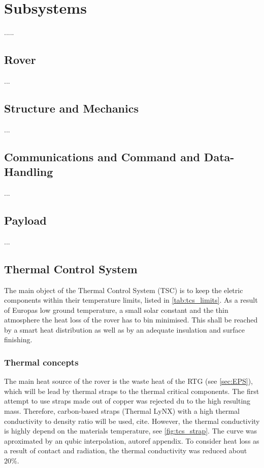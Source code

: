 \chapter{Subsystems}
\label{chap:subsystems}
.....



\section{Rover}
\label{sec:rover}
...
\section{Structure and Mechanics}
\label{sec:mechanics}
...
\section{Communications and Command and Data-Handling}
\label{sec:comm}
...
\section{Payload}
\label{sec:payload}
...
\clearpage
\section{Thermal Control System} \label{sec:thermalcontrol}
The main object of the Thermal Control System (TSC) is to keep the eletric components within their temperature limits, listed in \autoref{tab:tcs_limits}.
As a result of Europas low ground temperature, a small solar constant and the thin atmosphere the heat loss of the rover has to bin minimised.
This shall be reached by a smart heat distribution as well as by an adequate insulation and surface finishing.

\subsection{Thermal concepts}
The main heat source of the rover is the waste heat of the RTG (see \autoref{sec:EPS}), which will be lead by thermal straps to the thermal critical components.
The first attempt to use straps made out of copper was rejected du to the high resulting mass.
Therefore, carbon-based straps (Thermal LyNX) with a high thermal conductivity to density ratio will be used, cite.
However, the thermal conductivity is highly depend on the materials temperature, see \autoref{fig:tcs_strap}.
The curve was aproximated by an qubic interpolation, autoref appendix.
To consider heat loss as a result of contact and radiation, the thermal conductivity was reduced about $20\%$.


